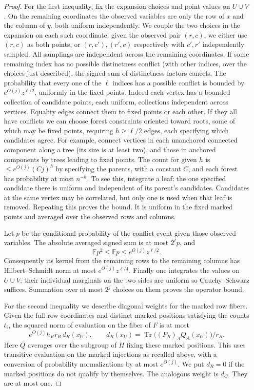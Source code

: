 \begin{proof}
For the first inequality, fix the expansion choices and point values on \(U\cup V\). On the remaining coordinates the observed variables are only the row of \(x\) and the column of \(y\), both uniform independently. We couple the two choices in the expansion on each such coordinate: given the observed pair \((r,c)\), we either use \((r,c)\) as both points, or \((r,c'),(r',c)\) respectively with \(c',r'\) independently sampled. All samplings are independent across the remaining coordinates. If some remaining index has no possible distinctness conflict (with other indices, over the choices just described), the signed sum of distinctness factors cancels. The probability that every one of the \(\ell\) indices has a possible conflict is bounded by \(e^{O(j)} z^{\ell/2}\), uniformly in the fixed points. Indeed each vertex has a bounded collection of candidate points, each uniform, collections independent across vertices. Equality edges connect them to fixed points or each other. If they all have conflicts we can choose forest constraints oriented toward roots, some of which may be fixed points, requiring \(h\ge \ell/2\) edges, each specifying which candidates agree. For example, connect vertices in each unanchored connected component along a tree (its size is at least two), and those in anchored components by trees leading to fixed points. The count for given \(h\) is \(\le e^{O(j)}(Cj)^h\) by specifying the parents, with a constant \(C\), and each forest has probability at most $n^{-h}$. To see this, integrate a leaf: the one specified candidate there is uniform and independent of its parent's candidates. Candidates at the same vertex may be correlated, but only one is used when that leaf is removed. Repeating this proves the bound. It is uniform in the fixed marked points and averaged over the observed rows and columns.

Let $p$ be the conditional probability of the conflict event given those observed variables. The absolute averaged signed sum is at most $2^\ell p$, and
\[
 \mathbb E p^2\le\mathbb E p\le e^{O(j)}z^{\ell/2}.
\]
Consequently its kernel from the remaining rows to the remaining columns has Hilbert--Schmidt norm at most $e^{O(j)}z^{\ell/4}$. Finally one integrates the values on \(U\cup V\); their individual marginals on the two sides are uniform so Cauchy--Schwarz suffices. Summation over at most \(2^j\) choices on them proves the operator bound.

For the second inequality we describe diagonal weights for the marked row fibers. Given the full row coordinates and distinct marked positions satisfying the counts \(t_i\), the squared norm of evaluation on the fiber of \(F\) is at most
\begin{equation}
 e^{O(j)} h_R r_R\,d_R(x_U),\qquad
 d_R(x_U)=\operatorname{Tr}\big((P_R)_A Q_A(x_U)\big)/r_R .
 \label{ten:frames:eq:9}
\end{equation}
Here \(Q\) averages over the subgroup of \(H\) fixing these marked positions. This uses transitive evaluation on the marked injections as recalled above, with a conversion of probability normalizations by at most \(e^{O(j)}\). We put \(d_R=0\) if the marked positions do not qualify by themselves. The analogous weight is \(d_C\). They are at most one.


\end{proof}
